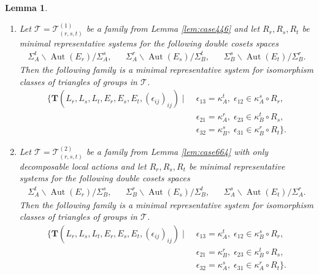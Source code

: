 \documentclass[dvipsnames]{article}
\newtheorem{lemma}[theorem]{Lemma}
\theoremstyle{definition}
\theoremstyle{remark}
\DeclareMathOperator{\Aut}{Aut}
\begin{document}
    \begin{lemma}\label{lem:dec_double_cosets}
        \begin{enumerate}
            \item
                Let $\mathcal T = \mathcal T_{(r,s,t)}^{(1)}$ be a family from Lemma \ref{lem:case446} and let $R_r, R_s, R_t$ be minimal representative systems for the following double cosets spaces
                \begin{align*}
                    \Sigma_A^t \backslash \Aut(E_r) / \Sigma_A^s, &&
                    \Sigma_A^r \backslash \Aut(E_s) / \Sigma_B^t, &&
                    \Sigma_B^s \backslash \Aut(E_t) / \Sigma_B^r.
                \end{align*}
                Then the following family is a minimal representative system for isomorphism classes of triangles of groups in $\mathcal T$.
                \begin{align*}
                    \{
                        \textbf{T}(L_r, L_s, L_t, E_r, E_s, E_t, (\epsilon_{ij})_{ij})
                        \mid\;
                        & \epsilon_{13} = \kappa_A^t, \;
                        \epsilon_{12} \in \kappa_A^s \circ R_r,\\
                        &\epsilon_{21} = \kappa_A^r, \;
                        \epsilon_{23} \in \kappa_B^t \circ R_s,\\
                        &\epsilon_{32} = \kappa_B^s ,\;
                        \epsilon_{31} \in \kappa_B^r \circ R_t
                    \}.
                \end{align*}
            \item
                Let $\mathcal T = \mathcal T_{(r,s,t)}^{(2)}$ be a family from Lemma \ref{lem:case664} with only decomposable local actions and let $R_r, R_s, R_t$ be minimal representative systems for the following double cosets spaces
                \begin{align*}
                    \Sigma_A^t \backslash \Aut(E_r) / \Sigma_B^s, &&
                    \Sigma_B^r \backslash \Aut(E_s) / \Sigma_B^t, &&
                    \Sigma_A^s \backslash \Aut(E_t) / \Sigma_A^r.
                \end{align*}
                Then the following family is a minimal representative system for isomorphism classes of triangles of groups in $\mathcal T$.
                \begin{align*}
                    \{
                        \textbf{T}(L_r, L_s, L_t, E_r, E_s, E_t, (\epsilon_{ij})_{ij})
                        \mid\;
                        & \epsilon_{13} = \kappa_A^t, \;
                        \epsilon_{12} \in \kappa_B^s \circ R_r,\\
                        &\epsilon_{21} = \kappa_B^r, \;
                        \epsilon_{23} \in \kappa_B^t \circ R_s,\\
                        &\epsilon_{32} = \kappa_A^s ,\;
                        \epsilon_{31} \in \kappa_A^r \circ R_t
                    \}.
                \end{align*}
        \end{enumerate}
    \end{lemma}
\end{document}
